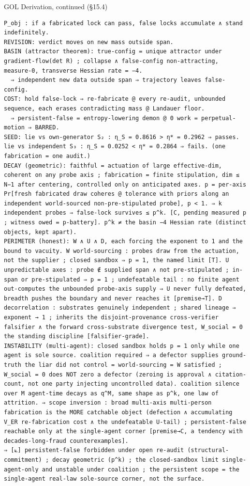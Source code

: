 \documentclass[10pt,twocolumn]{article}
\begin{document}
\begin{golbox}{GOL Derivation, continued (§15.4)}
\begin{lstlisting}[style=golv]
P_obj : if a fabricated lock can pass, false locks accumulate ∧ stand indefinitely.
REVISION: verdict moves on new mass outside span.
BASIN (attractor theorem): true-config = unique attractor under gradient-flow(det R) ; collapse ∧ false-config non-attracting, measure-0, transverse Hessian rate = −4.
  ⇒ independent new data outside span ⇒ trajectory leaves false-config.
COST: hold false-lock ⇒ re-fabricate @ every re-audit, unbounded sequence, each erases contradicting mass @ Landauer floor.
  ⇒ persistent-false = entropy-lowering demon @ 0 work = perpetual-motion ⇒ BARRED.
SEED: lie vs own-generator S₂ : η_S = 0.8616 > η* = 0.2962 ⇒ passes. lie vs independent S₃ : η_S = 0.0252 < η* = 0.2864 ⇒ fails. (one fabrication = one audit.)
DECAY (geometric): faithful = actuation of large effective-dim, coherent on any probe axis ; fabrication = finite stipulation, dim ≤ N−1 after centering, controlled only on anticipated axes. p = per-axis Pr[fresh fabricated draw coheres @ tolerance with priors along an independent world-sourced non-pre-stipulated probe], p < 1. ⇒ k independent probes ⇒ false-lock survives ≤ p^k. [C, pending measured p ; witness owed = p-battery]. p^k ≠ the basin −4 Hessian rate (distinct objects, kept apart).
PERIMETER (honest): W ∧ U ∧ D, each forcing the exponent to 1 and the bound to vacuity. W world-sourcing : probes draw from the actuation, not the supplier ; closed sandbox ⇒ p = 1, the named limit [T]. U unpredictable axes : probe ∉ supplied span ∧ not pre-stipulated ; in-span or pre-stipulated ⇒ p = 1 ; undefeatable tail : no finite agent out-computes the unbounded probe-axis supply ⇒ U never fully defeated, breadth pushes the boundary and never reaches it [premise→T]. D decorrelation : substrates genuinely independent ; shared lineage ⇒ exponent → 1 ; inherits the disjoint-provenance cross-verifier falsifier ∧ the forward cross-substrate divergence test, W_social = 0 the standing discipline [falsifier-grade].
INSTABILITY (multi-agent): closed sandbox holds p = 1 only while one agent is sole source. coalition required ⇒ a defector supplies ground-truth the liar did not control = world-sourcing = W satisfied ; W_social = 0 does NOT zero a defector (zeroing is approval ∧ citation-count, not one party injecting uncontrolled data). coalition silence over M agent-time decays as q^M, same shape as p^k, one law of attrition. ⇒ scope inversion : broad multi-axis multi-person fabrication is the MORE catchable object (defection ∧ accumulating V_ER re-fabrication cost ∧ the undefeatable U-tail) ; persistent-false reachable only at the single-agent corner [premise→C, a tendency with decades-long-fraud counterexamples].
⇒ [⟀] persistent-false forbidden under open re-audit (structural-commitment) ; decay geometric (p^k) ; the closed-sandbox limit single-agent-only and unstable under coalition ; the persistent scope = the single-agent real-law sole-source corner, not the surface.
\end{lstlisting}
\end{golbox}
\end{document}
